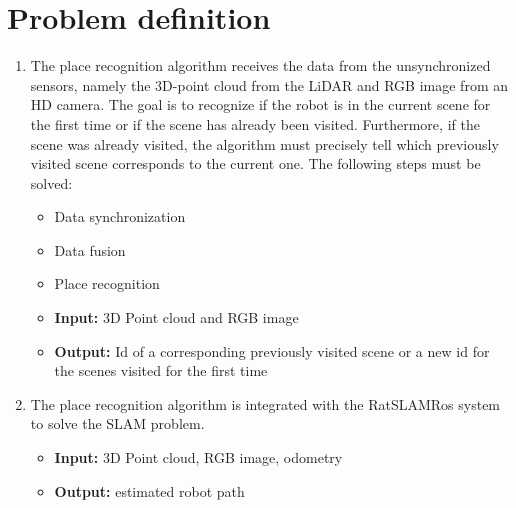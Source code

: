 \section{Problem definition}\label{section:problemDefinition}

\begin{enumerate}
    \item The place recognition algorithm receives the data from the unsynchronized sensors, namely the 3D-point cloud from the LiDAR and RGB image from an HD camera. The goal is to recognize if the robot is in the current scene for the first time or if the scene has already been visited. Furthermore, if the scene was already visited, the algorithm must precisely tell which previously visited scene corresponds to the current one. The following steps must be solved:
          \begin{itemize}
              \item Data synchronization
              \item Data fusion
              \item Place recognition
                    \\
              \item \textbf{Input:} 3D Point cloud and RGB image
              \item \textbf{Output:} Id of a corresponding previously visited scene or a new id for the scenes visited for the first time
          \end{itemize}
    \item The place recognition algorithm is integrated with the RatSLAMRos system to solve the SLAM problem.
          \begin{itemize}
              \item \textbf{Input:} 3D Point cloud, RGB image, odometry
              \item \textbf{Output:} estimated robot path
          \end{itemize}
\end{enumerate}